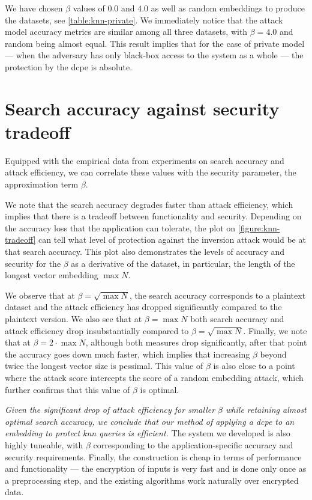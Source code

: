				

				We have chosen $\beta$ values of $0.0$ and $4.0$ as well as random embeddings to produce the datasets, see \cref{table:knn-private}.
				We immediately notice that the attack model accuracy metrics are similar among all three datasets, with $\beta = 4.0$ and random being almost equal.
				This result implies that for the case of private model --- when the adversary has only black-box access to the system as a whole --- the protection by the \acrshort{dcpe} is absolute.

	\section{Search accuracy against security tradeoff}

		Equipped with the empirical data from experiments on search accuracy and attack efficiency, we can correlate these values with the security parameter, the approximation term $\beta$.

		

		We note that the search accuracy degrades faster than attack efficiency, which implies that there is a tradeoff between functionality and security.
		Depending on the accuracy loss that the application can tolerate, the plot on \cref{figure:knn-tradeoff} can tell what level of protection against the inversion attack would be at that search accuracy.
		This plot also demonstrates the levels of accuracy and security for the $\beta$ as a derivative of the dataset, in particular, the length of the longest vector embedding $\max N$.

		We observe that at $\beta = \sqrt{\max N}$, the search accuracy corresponds to a plaintext dataset and the attack efficiency has dropped significantly compared to the plaintext version.
		We also see that at $\beta = \max N$ both search accuracy and attack efficiency drop insubstantially compared to $\beta = \sqrt{\max N}$.
		Finally, we note that at $\beta = 2 \cdot \max N$, although both measures drop significantly, after that point the accuracy goes down much faster, which implies that increasing $\beta$ beyond twice the longest vector size is pessimal.
		This value of $\beta$ is also close to a point where the attack \FOne{} score intercepts the \FOne{} score of a random embedding attack, which further confirms that this value of $\beta$ is optimal.

		\emph{Given the significant drop of attack efficiency for smaller $\beta$ while retaining almost optimal search accuracy, we conclude that our method of applying a \acrlong{dcpe} to an embedding to protect \acrshort{knn} queries is efficient.}
		The system we developed is also highly tuneable, with $\beta$ corresponding to the application-specific accuracy and security requirements.
		Finally, the construction is cheap in terms of performance and functionality --- the encryption of inputs is very fast and is done only once as a preprocessing step, and the existing algorithms work naturally over encrypted data.

